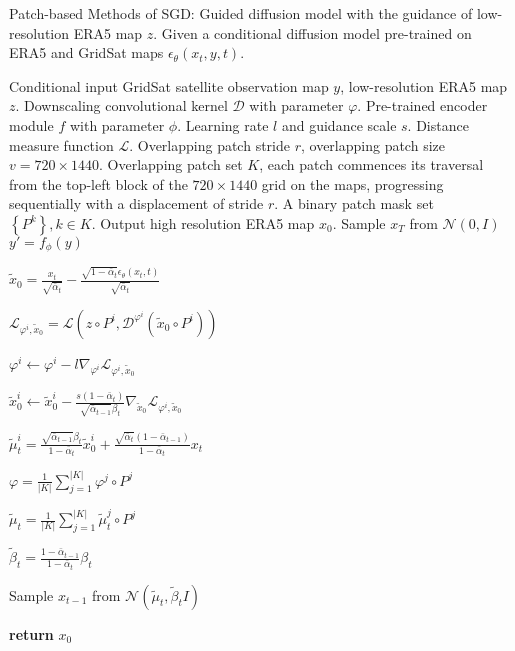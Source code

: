 \begin{algorithm}[t]\small
\renewcommand{\algorithmicrequire}{\textbf{Input:}}
\renewcommand{\algorithmicensure}{\textbf{Output:}}
\caption{Patch-based Methods of SGD: Guided diffusion model with the guidance of low-resolution ERA5 map $z$. Given a conditional diffusion model pre-trained on ERA5 and GridSat maps $\epsilon_\theta(x_t,y,t)$. }
\label{app_alg}
\begin{algorithmic}[1]
\REQUIRE Conditional input GridSat satellite observation map $y$, low-resolution ERA5 map $z$. Downscaling convolutional kernel $\mathcal{D}$ with parameter $\varphi$. Pre-trained encoder module $f$ with parameter $\phi$. Learning rate $l$ and guidance scale $s$. Distance measure function $\mathcal{L}$. Overlapping patch stride $r$, overlapping patch size $v=720\times 1440$. Overlapping patch set $K$, each patch commences its traversal from the top-left block of the $720\times 1440$ grid on the maps, progressing sequentially with a displacement of stride $r$. A binary patch mask set $\left \{ P^k \right \} ,k\in K$.
\ENSURE Output high resolution ERA5 map $x_0$.
\STATE Sample $x_T$ from $\mathcal{N}(0,I)$ 
\STATE $y'=f_\phi(y)$
    
        \STATE $\tilde{x} _0=\frac{x_t}{\sqrt{\bar{\alpha}_t }}-\frac{\sqrt{1-\bar{\alpha}_t}\epsilon_\theta(x_t,t)}{\sqrt{\bar{\alpha}_t }}$\

        \STATE $\mathcal{L}_{\varphi^i,\tilde{x}_0} =\mathcal{L}(z\circ P^i,\mathcal{D}^{\varphi^i}(\tilde{x}_0\circ P^i))$\

        \STATE $\varphi^i \gets \varphi^i-l\nabla_{\varphi^i}\mathcal{L}_{\varphi^i,\tilde{x}_0}$\

        \STATE $\tilde{x}_0^i \gets \tilde{x}_0^i-\frac{s(1-\bar{\alpha}_t) }{\sqrt{\bar{\alpha}_{t-1}}\beta_t}\nabla_{{\tilde{x}}_0}\mathcal{L}_{\varphi^i,\tilde{x}_0}$\

        \STATE $\tilde{\mu}_t^i=\frac{\sqrt{\bar{\alpha}_{t-1}}\beta_t}{1-\bar{\alpha}_t}\tilde{x}_0^i+\frac{\sqrt{\bar{\alpha}_{t}}(1-\bar{\alpha}_{t-1})}{1-\bar{\alpha}_t}{x}_t$\

        \ENDFOR
        
        \STATE $\varphi =\frac{1}{\left | K \right | }\sum_{j=1}^{\left | K \right | } \varphi^j \circ P^j$\
        
       \STATE $\tilde{\mu}_t=\frac{1}{\left | K \right | }\sum_{j=1}^{\left | K \right | } \tilde{\mu}_t^j \circ P^j$\

        \STATE $\tilde{\beta}_t=\frac{1-\bar{\alpha}_{t-1}}{1-\bar{\alpha}_t}\beta_t$\
        \ENDFOR
        
        \STATE Sample $x_{t-1}$ from $\mathcal{N}(\tilde{\mu}_t,\tilde{\beta}_tI)$\
    
\textbf{return} $x_0$
    \end{algorithmic}
\end{algorithm}

